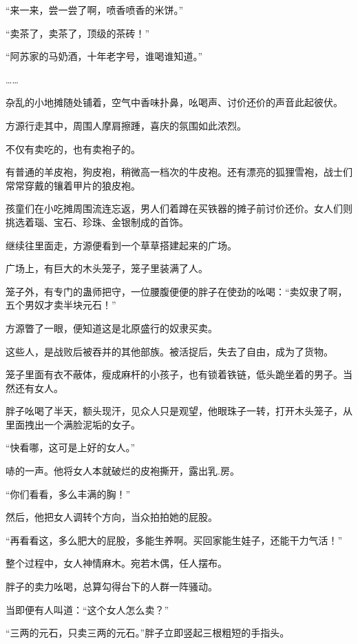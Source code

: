 
\begin{this_body}

“来一来，尝一尝了啊，喷香喷香的米饼。”

“卖茶了，卖茶了，顶级的茶砖！”

“阿苏家的马奶酒，十年老字号，谁喝谁知道。”

……

杂乱的小地摊随处铺着，空气中香味扑鼻，吆喝声、讨价还价的声音此起彼伏。

方源行走其中，周围人摩肩擦踵，喜庆的氛围如此浓烈。

不仅有卖吃的，也有卖袍子的。

有普通的羊皮袍，狗皮袍，稍微高一档次的牛皮袍。还有漂亮的狐狸雪袍，战士们常常穿戴的镶着甲片的狼皮袍。

孩童们在小吃摊周围流连忘返，男人们着蹲在买铁器的摊子前讨价还价。女人们则挑选着瑙、宝石、珍珠、金银制成的首饰。

继续往里面走，方源便看到一个草草搭建起来的广场。

广场上，有巨大的木头笼子，笼子里装满了人。

笼子外，有专门的蛊师把守，一位腰腹便便的胖子在使劲的吆喝：“卖奴隶了啊，五个男奴才卖半块元石！”

方源瞥了一眼，便知道这是北原盛行的奴隶买卖。

这些人，是战败后被吞并的其他部族。被活捉后，失去了自由，成为了货物。

笼子里面有衣不蔽体，瘦成麻杆的小孩子，也有锁着铁链，低头跪坐着的男子。当然还有女人。

胖子吆喝了半天，额头现汗，见众人只是观望，他眼珠子一转，打开木头笼子，从里面拽出一个满脸泥垢的女子。

“快看哪，这可是上好的女人。”

哧的一声。他将女人本就破烂的皮袍撕开，露出乳.房。

“你们看看，多么丰满的胸！”

然后，他把女人调转个方向，当众拍拍她的屁股。

“再看看这，多么肥大的屁股，多能生养啊。买回家能生娃子，还能干力气活！”

整个过程中，女人神情麻木。宛若木偶，任人摆布。

胖子的卖力吆喝，总算勾得台下的人群一阵骚动。

当即便有人叫道：“这个女人怎么卖？”

“三两的元石，只卖三两的元石。”胖子立即竖起三根粗短的手指头。


\end{this_body}
